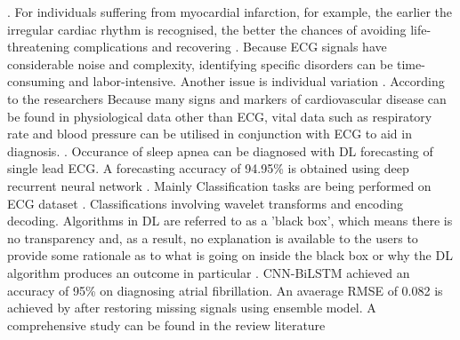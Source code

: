 . For individuals suffering from myocardial infarction,  for example,  the earlier the irregular cardiac rhythm is recognised,  the better the chances of avoiding life-threatening complications and recovering \cite{pollard2000acute}. Because ECG signals have considerable noise and complexity,  identifying specific disorders can be time-consuming and labor-intensive. Another issue is individual variation \cite{de2011weighted}. According to the researchers Because many signs and markers of cardiovascular disease can be found in physiological data other than ECG,  vital data such as respiratory rate and blood pressure can be utilised in conjunction with ECG to aid in diagnosis.
\cite{xu2018raim}. Occurance of sleep apnea can be diagnosed with DL forecasting of single lead ECG. A forecasting accuracy of 94.95\% is obtained using deep recurrent neural network \cite{bahrami2022deep}. Mainly Classification tasks are being performed on ECG dataset \cite{strodthoff2020deep}. Classifications involving wavelet transforms and encoding decoding\cite{mewada20232d}. Algorithms in DL are referred to as a 'black box',  which means there is no transparency and,  as a result,  no explanation is available to the users to provide some rationale as to what is going on inside the black box or why the DL algorithm produces an outcome in particular \cite{von2021transparency}. CNN-BiLSTM achieved an accuracy of 95\% on diagnosing atrial fibrillation\cite{aldughayfiq2023deep}. An avaerage RMSE of 0.082 is achieved by \cite{yoo2023restoration} after restoring missing signals using ensemble model. A comprehensive study can be found in the review literature \cite{musa2023systematic}
